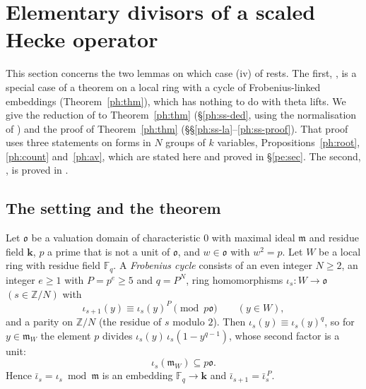 \documentclass[10pt]{amsart}
\theoremstyle{definition}
\theoremstyle{remark}
\newcommand{\Z}{\mathbb Z}
\providecommand{\auDX}{D_X}
\providecommand{\auF}{\mathbb F}
\providecommand{\auGL}{\mathrm{GL}}
\providecommand{\auPa}{\Phi_a}
\providecommand{\auS}{\mathcal S}
\providecommand{\aubar}[1]{\overline{#1}}
\providecommand{\aucol}{\operatorname{col}}
\providecommand{\pam}{\mathfrak m}
\providecommand{\pao}{\mathfrak o}
\providecommand{\phA}{\mathfrak A}
\providecommand{\phB}{\mathfrak B}
\providecommand{\phcd}{c_{\mathrm{div}}}
\providecommand{\phdef}{\operatorname{def}}
\providecommand{\phdep}{\operatorname{dp}}
\providecommand{\phk}{\boldsymbol k}
\begin{document}
\providecommand{\auO}{\mathcal O}
\providecommand{\auPl}{\Phi}
\providecommand{\auPa}{\Phi_a}
\providecommand{\auS}{\mathcal S}
\providecommand{\auDX}{D_X}
\providecommand{\auGL}{\mathrm{GL}}
\providecommand{\auU}{\mathrm U}
\providecommand{\auF}{\mathbb F}
\providecommand{\aucol}{\operatorname{col}}
\providecommand{\aubar}[1]{\overline{#1}}
\providecommand{\auf}[1]{\texttt{#1}}
\providecommand{\pao}{\mathfrak o}
\providecommand{\pam}{\mathfrak m}
\providecommand{\phB}{\mathfrak B}
\providecommand{\phA}{\mathfrak A}
\providecommand{\phk}{\boldsymbol k}
\providecommand{\phdep}{\operatorname{dp}}
\providecommand{\phdef}{\operatorname{def}}
\providecommand{\phim}{\operatorname{im}}
\providecommand{\phcd}{c_{\mathrm{div}}}

\section{Elementary divisors of a scaled Hecke operator}\label{ph:sec}

This section concerns the two lemmas on which case (iv) of {\cite[Theorem~4.21]{P49}} rests. The
first, {\cite[Lemma~4.19]{P49}}, is a special case of a theorem on a
local ring with a cycle of Frobenius-linked embeddings (Theorem~\ref{ph:thm}), which has nothing to
do with theta lifts. We give the reduction of {\cite[Lemma~4.19]{P49}} to Theorem~\ref{ph:thm}
(\S\ref{ph:ss-ded}, using the normalisation of {\cite[\S6.1]{P49}}) and the proof of Theorem~\ref{ph:thm}
(\S\S\ref{ph:ss-la}--\ref{ph:ss-proof}). That proof uses three statements on forms in
$N$ groups of $k$ variables, Propositions~\ref{ph:root}, \ref{ph:count} and~\ref{ph:av}, which are
stated here and proved in \S\ref{pe:sec}. The second, {\cite[Lemma~4.18]{P49}}, is proved in {\cite[\S6.6]{P49}}.

\subsection{The setting and the theorem}\label{ph:ss-set}
Let $\pao$ be a valuation domain of characteristic $0$ with maximal ideal $\pam$ and residue field
$\phk$, $p$ a prime that is not a unit of $\pao$, and $w\in\pao$ with $w^2=p$. Let $W$ be a local
ring with residue field $\auF_q$. A \emph{Frobenius cycle} consists of an even integer $N\ge2$, an
integer $e\ge1$ with $P=p^e\ge5$ and $q=P^N$, ring homomorphisms $\iota_s\colon W\to\pao$
$(s\in\Z/N)$ with
\[
\iota_{s+1}(y)\equiv\iota_s(y)^P\pmod{p\pao}\qquad(y\in W),
\]
and a parity on $\Z/N$ (the residue of $s$ modulo $2$). Then $\iota_s(y)\equiv\iota_s(y)^q$, so for
$y\in\pam_W$ the element $p$ divides $\iota_s(y)\,\iota_s(1-y^{q-1})$, whose second factor is a
unit:
\begin{equation}\label{ph:eq-max}
\iota_s(\pam_W)\subseteq p\pao .
\end{equation}
Hence $\bar\iota_s=\iota_s\bmod\pam$ is an embedding $\auF_q\to\phk$ and
$\bar\iota_{s+1}=\bar\iota_s^{\,P}$.
\end{document}
